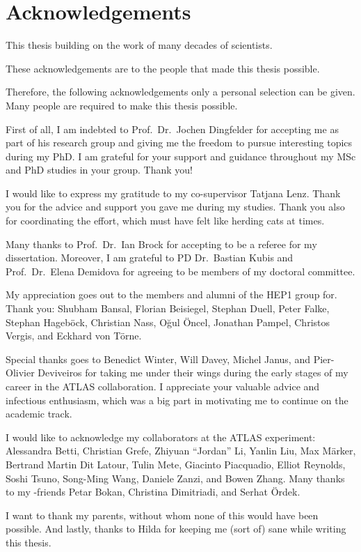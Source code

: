 \chapter*{Acknowledgements}


This thesis building on the work of many decades of scientists.

These acknowledgements are to the people that made this thesis possible.

Therefore, the following acknowledgements only a personal selection can be
given. Many people are required to make this thesis possible.

First of all, I am indebted to Prof.\ Dr.\ Jochen Dingfelder for accepting me as
part of his research group and giving me the freedom to pursue interesting
topics during my PhD. I am grateful for your support and guidance throughout my
MSc and PhD studies in your group. Thank you!

I would like to express my gratitude to my co-supervisor Tatjana Lenz. Thank you
for the advice and support you gave me during my studies. Thank you also for
coordinating the \bbtautau effort, which must have felt like herding cats at
times.

Many thanks to Prof.\ Dr.\ Ian Brock for accepting to be a referee for my
dissertation. Moreover, I am grateful to PD Dr.\ Bastian Kubis and Prof.\ Dr.\
Elena Demidova for agreeing to be members of my doctoral committee.

My appreciation goes out to the members and alumni of the \textsc{HEP1} group
for. Thank you: Shubham Bansal, Florian Beisiegel, Stephan Duell, Peter Falke,
Stephan Hageböck, Christian Nass, Oğul Öncel, Jonathan Pampel, Christos Vergis,
and Eckhard von Törne.

Special thanks goes to Benedict Winter, Will Davey, Michel Janus, and
Pier-Olivier Deviveiros for taking me under their wings during the early stages
of my career in the ATLAS collaboration. I appreciate your valuable advice and
infectious enthusiasm, which was a big part in motivating me to continue on the
academic track.

I would like to acknowledge my collaborators at the ATLAS experiment: Alessandra
Betti, Christian Grefe, Zhiyuan ``Jordan'' Li, Yanlin Liu, Max Märker, Bertrand
Martin Dit Latour, Tulin Mete, Giacinto Piacquadio, Elliot Reynolds, Soshi
Tsuno, Song-Ming Wang, Daniele Zanzi, and Bowen Zhang. Many thanks to my
\bbtautau-friends Petar Bokan, Christina Dimitriadi, and Serhat Ördek.

I want to thank my parents, without whom none of this would have been
possible. And lastly, thanks to Hilda for keeping me (sort of) sane while
writing this thesis.



